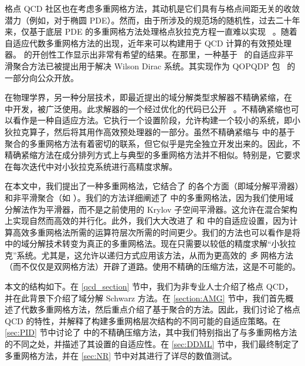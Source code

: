 \documentclass{siamltex}
\begin{document}
格点 QCD 社区也在考虑多重网格方法，其动机是它们具有与格点间距无关的收敛潜力（例如，对于椭圆 PDE）。然而，由于所涉及的规范场的随机性，过去二十年来，仅基于底层 PDE 的多重网格方法处理格点狄拉克方程一直难以实现~    \cite{Ben-Av:1990gb,Brower:1987dd,Kalkreuter:1994fz,Vink:1991fa}    。随着自适应代数多重网格方法的出现，近年来可以构建用于 QCD 计算的有效预处理器。   \cite{MGClark2009, MGClark2010_1, MGClark2007, MGClark2010_2}    的开创性工作显示出非常有希望的结果。在那里，一种基于~    \cite{Brezina2005}    的自适应非平滑聚合方法已被提出用于解决 Wilson Dirac 系统。其实现作为 QOPQDP 包~    \cite{wwwQOPQDP}    的一部分向公众开放。

在物理学界，另一种分层技术，即最近提出的域分解类型求解器不精确紧缩，在    \cite{Luescher2007}    中开发，被广泛使用。此求解器的一个经过优化的代码已公开~    \cite{wwwDDHMC}    。不精确紧缩也可以看作是一种自适应方法。它执行一个设置阶段，允许构建一个较小的系统，即小狄拉克算子，然后将其用作高效预处理器的一部分。虽然不精确紧缩与    \cite{Brezina2005}    中的基于聚合的多重网格方法有着密切的联系，但它似乎是完全独立开发出来的。因此，不精确紧缩方法在成分排列方式上与典型的多重网格方法并不相似。特别是，它要求在每次迭代中对小狄拉克系统进行高精度求解。

在本文中，我们提出了一种多重网格法，它结合了    \cite{Luescher2007}    的各个方面（即域分解平滑器）和非平滑聚合（如    \cite{MGClark2010_1, MGClark2010_2}   ）。我们的方法详细阐述了    \cite{MGClark2010_1, MGClark2010_2}    中的多重网格法，因为我们使用域分解法作为平滑器，而不是之前使用的 Krylov 子空间平滑器。这允许在混合架构上实现自然而高效的并行化。此外，我们大大改进了    \cite{MGClark2010_1, MGClark2010_2}    和    \cite{Luescher2007}    中的自适应设置，因为计算高效多重网格法所需的运算符层次所需的时间更少。我们的方法也可以看作是将    \cite{Luescher2007}    中的域分解技术转变为真正的多重网格法。现在只需要以较低的精度求解“小狄拉克”系统。尤其是，这允许以递归方式应用该方法，从而为更高效的  {    \em    多   }  网格方法（而不仅仅是双网格方法）开辟了道路。使用不精确的压缩方法，这是不可能的。

本文的结构如下。在    \ref{qcd_section}    节中，我们为非专业人士介绍了格点 QCD，并在此背景下介绍了域分解 Schwarz 方法。在    \ref{section:AMG}    节中，我们首先概述了代数多重网格方法，然后重点介绍了基于聚合的方法。因此，我们讨论了格点 QCD 的特性，并解释了构建多重网格层次结构的不同可能的自适应策略。在    \ref{sec:PID}    节中讨论了    \cite{Luescher2007}    中的不精确压缩方法，其中我们特别指出了与多重网格方法的不同之处，并描述了其设置的自适应性。在    \ref{sec:DDML}    节中，我们最终制定了多重网格方法，并在    \ref{sec:NR}    节中对其进行了详尽的数值测试。
\end{document}
